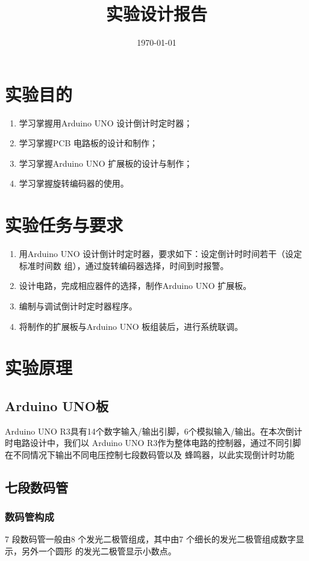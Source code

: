 \documentclass{../source/zjureport}
\title{实验设计报告}
\date{\today}
\begin{document}
    \makecover
    \makeheader

    \section{实验目的}
        \begin{enumerate}
            \item 学习掌握用Arduino UNO 设计倒计时定时器；
            \item 学习掌握PCB 电路板的设计和制作；
            \item 学习掌握Arduino UNO 扩展板的设计与制作；
            \item 学习掌握旋转编码器的使用。
        \end{enumerate}
    
    \section{实验任务与要求}
        \begin{enumerate}
            \item 用Arduino UNO 设计倒计时定时器，要求如下：设定倒计时时间若干（设定标准时间数
            组），通过旋转编码器选择，时间到时报警。
            \item 设计电路，完成相应器件的选择，制作Arduino UNO 扩展板。
            \item 编制与调试倒计时定时器程序。
            \item 将制作的扩展板与Arduino UNO 板组装后，进行系统联调。
        \end{enumerate}

    \section{实验原理}
        \subsection{Arduino UNO板}
        Arduino UNO R3具有14个数字输入/输出引脚，6个模拟输入/输出。在本次倒计时电路设计中，我们以
        Arduino UNO R3作为整体电路的控制器，通过不同引脚在不同情况下输出不同电压控制七段数码管以及
        蜂鸣器，以此实现倒计时功能

        \subsection{七段数码管}
            \subsubsection{数码管构成}
            7 段数码管一般由8 个发光二极管组成，其中由7 个细长的发光二极管组成数字显示，另外一个圆形
            的发光二极管显示小数点。
\end{document}
